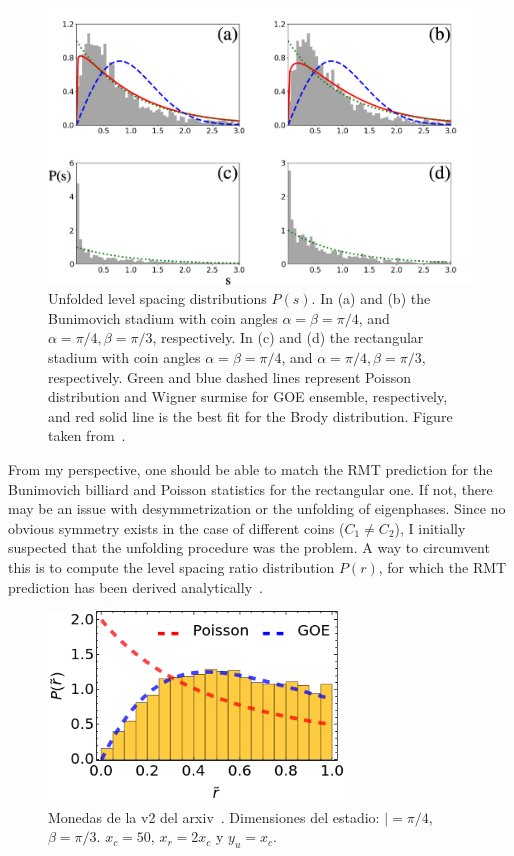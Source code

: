 \documentclass[10pt,letterpaper]{article} %
\begin{document}
\begin{figure}
\centering
\includegraphics[width=\textwidth]{Figure4.png}
\caption{
Unfolded level spacing distributions $P(s)$. In (a) and (b) the Bunimovich stadium 
with coin angles $\alpha = \beta = \pi/4$, and $\alpha = \pi/4, \beta =\pi/3$, 
respectively. In (c) and (d) the rectangular stadium with coin angles 
$\alpha = \beta = \pi/4$, and $\alpha = \pi/4, \beta =\pi/3$, 
respectively. Green and blue dashed lines represent Poisson distribution and 
Wigner surmise for GOE ensemble, respectively, and red solid line is the best 
fit for the Brody distribution.
Figure taken from~\cite{alonso-lobo_2025_simplest}.}
\label{fig:level:spacing:dist}
\end{figure}

From my perspective, one should be able to match the RMT prediction for the 
Bunimovich billiard and Poisson statistics for the rectangular one. If not, there 
may be an issue with desymmetrization or the unfolding of eigenphases. Since no 
obvious symmetry exists in the case of different coins ($C_1 \ne C_2$), I initially 
suspected that the unfolding procedure was the problem. A way to circumvent this 
is to compute the level spacing ratio distribution $P(r)$, for which the RMT 
prediction has been derived analytically~\cite{atas_2013_distribution}. 

\begin{figure}
\centering
\includegraphics[width=0.7\textwidth]{Uv2_xc_50_alpha_Pi-4_beta_Pi-3.png}
\caption{Monedas de la v2 del arxiv~\cite{alonso-lobo_2025_simplest}. 
Dimensiones del estadio:
$|=\pi / 4$, $\beta=\pi / 3$. $x_c = 50$, $x_r=2 x_c$ y $y_u = x_c$.}
\label{fig:1}
\end{figure}
\end{document}

